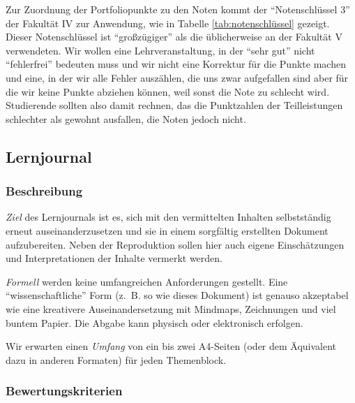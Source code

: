 \documentclass[DIV=15,headinclude]{scrartcl}
\begin{document}
Zur Zuordnung der Portfoliopunkte zu den Noten kommt der "`Notenschlüssel 3"' der Fakultät IV zur Anwendung, wie in Tabelle \ref{tab:notenschlüssel} gezeigt. Dieser Notenschlüssel ist "`großzügiger"' als die üblicherweise an der Fakultät V verwendeten. Wir wollen eine Lehrveranstaltung, in der "`sehr gut"' nicht "`fehlerfrei"' bedeuten muss und wir nicht eine Korrektur für die Punkte machen und eine, in der wir alle Fehler auszählen, die uns zwar aufgefallen sind aber für die wir keine Punkte abziehen können, weil sonst die Note zu schlecht wird. Studierende sollten also damit rechnen, das die Punktzahlen der Teilleistungen schlechter als gewohnt ausfallen, die Noten jedoch nicht.

\subsection{Lernjournal}

\subsubsection{Beschreibung}
\emph{Ziel} des Lernjournals ist es, sich mit den vermittelten Inhalten selbstständig erneut auseinanderzusetzen und sie in einem sorgfältig erstellten Dokument aufzubereiten. Neben der Reproduktion sollen hier auch eigene Einschätzungen und Interpretationen der Inhalte vermerkt werden.

\emph{Formell} werden keine umfangreichen Anforderungen gestellt. Eine "`wissenschaftliche"' Form (z.~B. so wie dieses Dokument) ist genauso akzeptabel wie eine kreativere Auseinandersetzung mit Mindmaps, Zeichnungen und viel buntem Papier. Die Abgabe kann physisch oder elektronisch erfolgen.

Wir erwarten einen \emph{Umfang} von ein bis zwei A4-Seiten (oder dem Äquivalent dazu in anderen Formaten) für jeden Themenblock.

\subsubsection{Bewertungskriterien}
\end{document}
